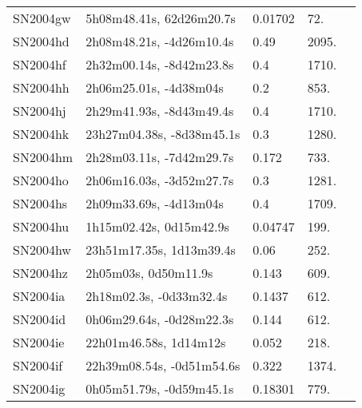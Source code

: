 \begin{longtable}{lllll}
         SN2004gw &       5h08m48.41s, 62d26m20.7s &  0.01702 &            72. &  \citet{2003AandA...412...57P} \\
         SN2004hd &       2h08m48.21s, -4d26m10.4s &     0.49 &          2095. &    \citet{2007ApJ...666..674M} \\
         SN2004hf &       2h32m00.14s, -8d42m23.8s &      0.4 &          1710. &    \citet{2005IAUC.8464B...1B} \\
         SN2004hh &         2h06m25.01s, -4d38m04s &      0.2 &           853. &    \citet{2005IAUC.8464B...1B} \\
         SN2004hj &       2h29m41.93s, -8d43m49.4s &      0.4 &          1710. &    \citet{2005IAUC.8464B...1B} \\
         SN2004hk &      23h27m04.38s, -8d38m45.1s &      0.3 &          1280. &    \citet{2005IAUC.8464B...1B} \\
         SN2004hm &       2h28m03.11s, -7d42m29.7s &    0.172 &           733. &    \citet{2007ApJ...666..674M} \\
         SN2004ho &       2h06m16.03s, -3d52m27.7s &      0.3 &          1281. &    \citet{2005IAUC.8464B...1B} \\
         SN2004hs &         2h09m33.69s, -4d13m04s &      0.4 &          1709. &    \citet{2005IAUC.8464B...1B} \\
         SN2004hu &        1h15m02.42s, 0d15m42.9s &  0.04747 &           199. &    \citet{2016SDSSD.C...0000:} \\
         SN2004hw &       23h51m17.35s, 1d13m39.4s &     0.06 &           252. &    \citet{2016SDSSD.C...0000:} \\
         SN2004hz &           2h05m03s, 0d50m11.9s &    0.143 &           609. &    \citet{2005IAUC.8481A...1A} \\
         SN2004ia &        2h18m02.3s, -0d33m32.4s &   0.1437 &           612. &    \citet{2004SDSS2.C...0000:} \\
         SN2004id &       0h06m29.64s, -0d28m22.3s &    0.144 &           612. &    \citet{2005IAUC.8481A...1A} \\
         SN2004ie &         22h01m46.58s, 1d14m12s &    0.052 &           218. &    \citet{2005IAUC.8481A...1A} \\
         SN2004if &      22h39m08.54s, -0d51m54.6s &    0.322 &          1374. &    \citet{2005IAUC.8481A...1A} \\
         SN2004ig &       0h05m51.79s, -0d59m45.1s &  0.18301 &           779. &    \citet{2016SDSSD.C...0000:} \\

\end{longtable}
